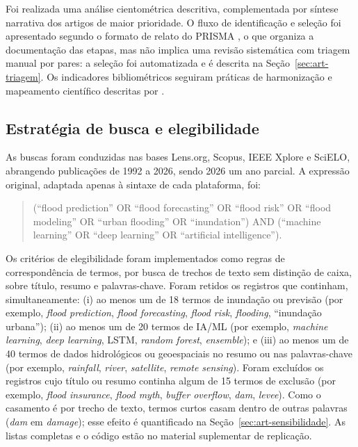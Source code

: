 Foi realizada uma análise cientométrica descritiva, complementada por síntese narrativa dos artigos de maior prioridade. O fluxo de identificação e seleção foi apresentado segundo o formato de relato do PRISMA \cite{page2021}, o que organiza a documentação das etapas, mas não implica uma revisão sistemática com triagem manual por pares: a seleção foi automatizada e é descrita na Seção~\ref{sec:art-triagem}. Os indicadores bibliométricos seguiram práticas de harmonização e mapeamento científico descritas por .

\subsection{Estratégia de busca e elegibilidade}

As buscas foram conduzidas nas bases Lens.org, Scopus, IEEE Xplore e SciELO, abrangendo publicações de 1992 a 2026, sendo 2026 um ano parcial. A expressão original, adaptada apenas à sintaxe de cada plataforma, foi:

\begin{quote}\small
(``flood prediction'' OR ``flood forecasting'' OR ``flood risk'' OR ``flood modeling'' OR ``urban flooding'' OR ``inundation'') AND (``machine learning'' OR ``deep learning'' OR ``artificial intelligence'').
\end{quote}

Os critérios de elegibilidade foram implementados como regras de correspondência de termos, por busca de trechos de texto sem distinção de caixa, sobre título, resumo e palavras-chave. Foram retidos os registros que continham, simultaneamente: (i) ao menos um de 18 termos de inundação ou previsão (por exemplo, \textit{flood prediction}, \textit{flood forecasting}, \textit{flood risk}, \textit{flooding}, ``inundação urbana''); (ii) ao menos um de 20 termos de IA/ML (por exemplo, \textit{machine learning}, \textit{deep learning}, LSTM, \textit{random forest}, \textit{ensemble}); e (iii) ao menos um de 40 termos de dados hidrológicos ou geoespaciais no resumo ou nas palavras-chave (por exemplo, \textit{rainfall}, \textit{river}, \textit{satellite}, \textit{remote sensing}). Foram excluídos os registros cujo título ou resumo continha algum de 15 termos de exclusão (por exemplo, \textit{flood insurance}, \textit{flood myth}, \textit{buffer overflow}, \textit{dam}, \textit{levee}). Como o casamento é por trecho de texto, termos curtos casam dentro de outras palavras (\textit{dam} em \textit{damage}); esse efeito é quantificado na Seção~\ref{sec:art-sensibilidade}. As listas completas e o código estão no material suplementar de replicação.

